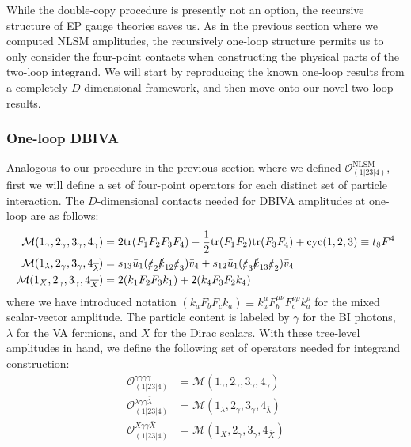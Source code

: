 \documentclass[12pt,letter]{article}
\begin{document}
While the double-copy procedure is presently not an option, the recursive structure of EP gauge theories saves us. As in the previous section where we computed NLSM amplitudes, the recursively one-loop structure permits us to only consider the four-point contacts when constructing the physical parts of the two-loop integrand. We will start by reproducing the known one-loop results from a completely $D$-dimensional framework, and then move onto our novel two-loop results. 

\subsubsection{One-loop DBIVA}\label{sec:1loopDBIU}
Analogous to our procedure in the previous section where we defined $\mathcal{O}^{\text{NLSM}}_{(1|23|4)}$, first we will define a set of four-point operators for each distinct set of particle interaction. The $D$-dimensional contacts needed for DBIVA amplitudes at one-loop are as follows:
\begin{align}
\mathcal{M}(1_\gamma,2_\gamma,3_\gamma,4_\gamma) &= 2\text{tr}(F_1F_2F_3F_4) - \frac{1}{2}\text{tr}(F_1F_2)\text{tr}(F_3F_4)+\text{cyc}(1,2,3) \equiv t_8 F^4
\\
\mathcal{M}(1_\lambda,2_\gamma,3_\gamma,4_{\overline{\lambda}}) &= s_{13}\bar{u}_1(\slashed{\varepsilon}_2\slashed{k}_{12}\slashed{\varepsilon}_3) \bar{v}_4 + s_{12}\bar{u}_1(\slashed{\varepsilon}_3\slashed{k}_{13}\slashed{\varepsilon}_2) \bar{v}_4
\\
\mathcal{M}(1_X,2_\gamma,3_\gamma,4_{\overline{X}}) &= 2 (k_1 F_2 F_3 k_1) +2 (k_4 F_3 F_2 k_4)
\end{align}
where we have introduced notation $(k_a F_b F_c k_a) \equiv k_a^\mu F^{\mu\nu}_bF^{\nu\rho}_c k_a^\rho$ for the mixed scalar-vector amplitude. The particle content is labeled by $\gamma$ for the BI photons, $\lambda$ for the VA fermions, and $X$ for the Dirac scalars. With these tree-level amplitudes in hand, we define the following set of operators needed for integrand construction:
\begin{align}
\mathcal{O}^{\gamma \gamma \gamma \gamma }_{(1|23|4)} &= \mathcal{M}(1_\gamma,2_\gamma,3_\gamma,4_\gamma)   
\\
\mathcal{O}^{\lambda \gamma \gamma \bar{\lambda} }_{(1|23|4)} &= \mathcal{M}(1_\lambda,2_\gamma,3_\gamma,4_{\overline{\lambda}})
\\
\mathcal{O}^{X \gamma \gamma \bar{X} }_{(1|23|4)} &= \mathcal{M}(1_X,2_\gamma,3_\gamma,4_{\overline{X}}) 
\end{align}
\end{document}
